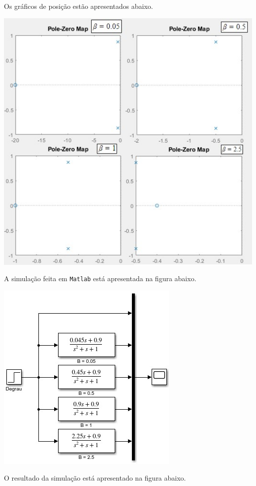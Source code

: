 \documentclass[
]{book}
\theoremstyle{definition}
\theoremstyle{definition}
\theoremstyle{definition}
\theoremstyle{remark}
\begin{document}
Os gráficos de posição estão apresentados abaixo.

\includegraphics{Imagens/Lab2/prob5Varios.jpg}

A simulação feita em \texttt{Matlab} está apresentada na figura abaixo.

\includegraphics{Imagens/Lab2/modelSim5.jpg}

O resultado da simulação está apresentado na figura abaixo.
\end{document}
